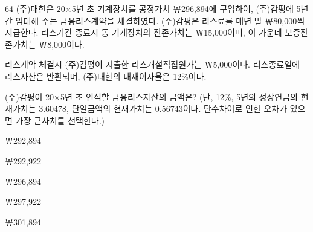 \begin{question}{64}
(주)대한은 20×5년 초 기계장치를 공정가치 ￦296,894에 구입하여, (주)감평에 5년간 임대해 주는 금융리스계약을 체결하였다. (주)감평은 리스료를 매년 말 ￦80,000씩 지급한다. 리스기간 종료시 동 기계장치의 잔존가치는 ￦15,000이며, 이 가운데 보증잔존가치는 ￦8,000이다. \par
리스계약 체결시 (주)감평이 지출한 리스개설직접원가는 ￦5,000이다. 리스종료일에 리스자산은 반환되며, (주)대한의 내재이자율은 12\%이다. \par
(주)감평이 20×5년 초 인식할 금융리스자산의 금액은? (단, 12\%, 5년의 정상연금의 현재가치는 3.60478, 단일금액의 현재가치는 0.56743이다. 단수차이로 인한 오차가 있으면 가장 근사치를 선택한다.)
\begin{choices}
  \item ￦292,894
  \item ￦292,922
  \item ￦296,894
  \item ￦297,922
  \item ￦301,894
\end{choices}
\end{question}
